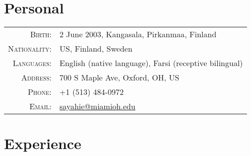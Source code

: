 \documentclass[a4paper,10pt]{article} %
\begin{document}
\pagestyle{empty} %


\par{\bigskip\par} %

\section{Personal}

\begin{tabular}{rl}
\textsc{Birth:} & 2 June 2003, Kangasala, Pirkanmaa, Finland \\
\textsc{Nationality:} & US, Finland, Sweden \\
\textsc{Languages:} & English (native language), Farsi (receptive bilingual)\\
\textsc{Address:} & 700 S Maple Ave, Oxford, OH, US \\
\textsc{Phone:} & +1 (513) 484-0972\\
\textsc{Email:} & \href{mailto:sayahie@miamioh.edu}{sayahie@miamioh.edu}\\
\end{tabular}


\section{Experience}
\end{document}
